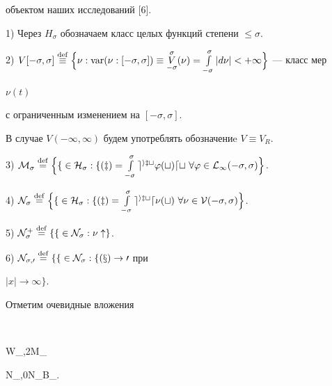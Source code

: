 объектом наших исследований [6]. 


 


1) Через $H_\sigma$ обозначаем класс целых функций степени $\le\sigma$. 


 


2) $V[-\sigma,\sigma]\overset{\mathrm{def}}{\equiv}


\Big\{\nu:\var(\nu:[-\sigma,\sigma])\equiv 


\overset{\sigma}{\underset{-\sigma}{V}}(\nu)= 


\int\limits^\sigma_{-\sigma}|d\nu|<+\infty\Big\}$ --- класс мер 


$\nu(t)$ 


с ограниченным изменением на $[-\sigma,\sigma]$. 


 


В случае $V(-\infty,\infty)$ будем употреблять обозначениe $V\equiv V_R$. 


 


3) $\cal M_\sigma\updef\Big\{f\in 


H_\sigma:f(z)=\int\limits^\sigma_{-\sigma} e^{izt}\varphi(t)dt 


\ \forall\varphi\in L_1(-\sigma,\sigma)\Big\}$. 


 


4) $\cal N_\sigma\updef\Big\{f\in 


H_\sigma:f(z)=\int\limits^\sigma_{-\sigma} e^{izt}d\nu(t)\ \forall 


\nu\in V(-\sigma,\sigma)\Big\}$. 


 


5) $\cal N^+_\sigma\overset{\mathrm{def}}{=}\{f\in\cal N_\sigma:\nu\uparrow\}$. 


 


6) $\cal N_{\sigma,0}\overset{\mathrm{def}}{=}\{f\in\cal N_\sigma:f(x)\to0$ при 


$|x|\to\infty\}$. 


 


Отметим очевидные вложения 


$$ 


W_{\sigma,2}\subset\cal M_\sigma\subset 


\cal N_{\sigma,0}\subset\cal N_\sigma\subset B_\sigma. 


